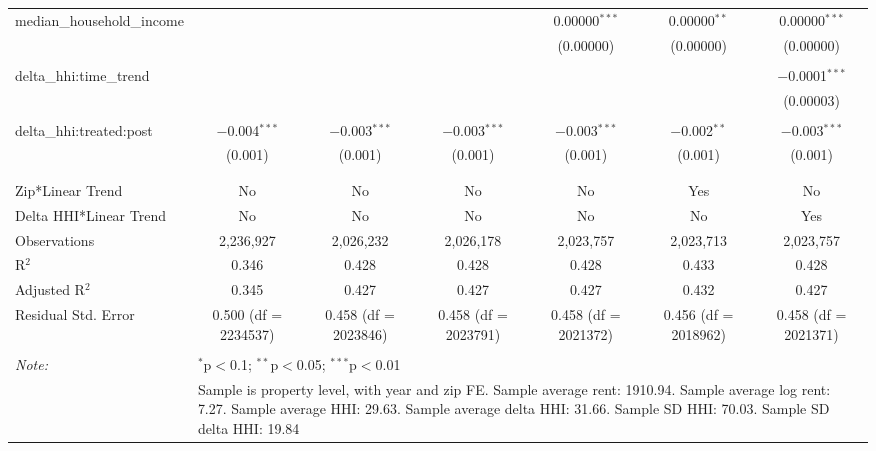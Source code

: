 \begin{table}[H]
{\begin{tabular}{@{\extracolsep{5pt}}lcccccc}
  median\_household\_income &  &  &  & 0.00000$^{***}$ & 0.00000$^{**}$ & 0.00000$^{***}$ \\  

   &  &  &  & (0.00000) & (0.00000) & (0.00000) \\  

   & & & & & & \\  

  delta\_hhi:time\_trend &  &  &  &  &  & $-$0.0001$^{***}$ \\  

   &  &  &  &  &  & (0.00003) \\  

   & & & & & & \\  

  delta\_hhi:treated:post & $-$0.004$^{***}$ & $-$0.003$^{***}$ & $-$0.003$^{***}$ & $-$0.003$^{***}$ & $-$0.002$^{**}$ & $-$0.003$^{***}$ \\  

   & (0.001) & (0.001) & (0.001) & (0.001) & (0.001) & (0.001) \\  

   & & & & & & \\  

 \hline \\[-1.8ex]  

 Zip*Linear Trend & No & No & No & No & Yes & No \\  

 Delta HHI*Linear Trend & No & No & No & No & No & Yes \\  

 Observations & 2,236,927 & 2,026,232 & 2,026,178 & 2,023,757 & 2,023,713 & 2,023,757 \\  

 R$^{2}$ & 0.346 & 0.428 & 0.428 & 0.428 & 0.433 & 0.428 \\  

 Adjusted R$^{2}$ & 0.345 & 0.427 & 0.427 & 0.427 & 0.432 & 0.427 \\  

 Residual Std. Error & 0.500 (df = 2234537) & 0.458 (df = 2023846) & 0.458 (df = 2023791) & 0.458 (df = 2021372) & 0.456 (df = 2018962) & 0.458 (df = 2021371) \\  

 \hline  

 \hline \\[-1.8ex]  

 \textit{Note:}  & \multicolumn{6}{l}{$^{*}$p$<$0.1; $^{**}$p$<$0.05; $^{***}$p$<$0.01} \\  

  & \multicolumn{6}{l}{Sample is property level, with year and zip FE. Sample average rent: 1910.94. Sample average log rent: 7.27. Sample average HHI: 29.63. Sample average delta HHI: 31.66. Sample SD HHI: 70.03. Sample SD delta HHI: 19.84} \\  

 \end{tabular}}  

 \end{table}  

